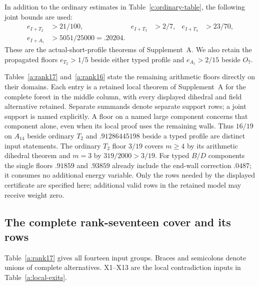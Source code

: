 In addition to the ordinary estimates in
Table~\ref{c:ordinary-table}, the following joint bounds are used:
\begin{align}
 e_{I+T_2}&>21/100,& e_{I+T_3}&>2/7,&
 e_{I+T_4}&>23/70,\label{a:I-joints}\\
 e_{I+A_1}&>5051/25000=.20204.\label{a:I-A1}
\end{align}
These are the actual-short-profile theorems of Supplement~A.
We also retain the propagated floors $e_{T_2}>1/5$ beside either
typed profile and $e_{A_1}>2/15$ beside $O_7$.

Tables~\ref{a:rank17} and~\ref{a:rank16} state the remaining
arithmetic floors directly on their domains. Each entry is a retained
local theorem of Supplement~A for the complete forest in the middle
column, with every displayed dihedral and field alternative retained.
Separate summands denote separate support rows; a joint support is
named explicitly. A floor on a named large component concerns that
component alone, even when its local proof uses the remaining walls.
Thus $16/19$ on $A_{14}$ beside ordinary $T_2$ and
$.91286445198$ beside a typed profile are distinct input statements.
The ordinary $T_2$ floor $3/19$ covers $m\ge4$ by its arithmetic
dihedral theorem and $m=3$ by $319/2000>3/19$.
For typed $B/D$ components the single floors $.91859$ and $.93859$
already include the end-wall correction $.0487$; it consumes no
additional energy variable. Only the rows needed by the displayed
certificate are specified here; additional valid rows in the retained
model may receive weight zero.

\subsection{The complete rank-seventeen cover and its rows}
\label{a:rank17-section}

Table~\ref{a:rank17} gives all fourteen input groups. Braces and
semicolons denote unions of complete alternatives. X1--X13 are the
local contradiction inputs in Table~\ref{a:local-exits}.

